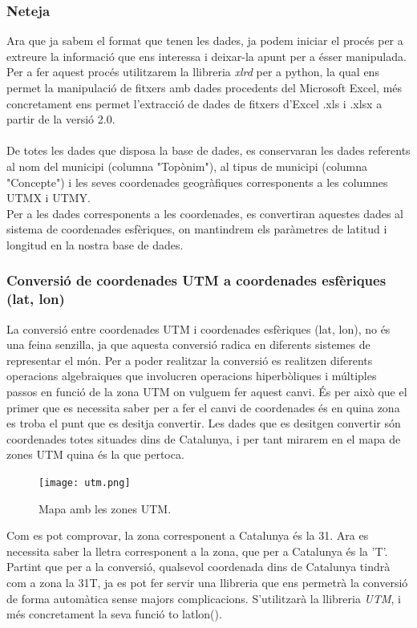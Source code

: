 \documentclass[12pt,a4paper,openright,oneside]{article}
\numberwithin{equation}{section}
\theoremstyle{definition}
\begin{document}
\subsubsection*{Neteja}
Ara que ja sabem el format que tenen les dades, ja podem iniciar el procés per a extreure la informació que ens interessa i deixar-la apunt per a ésser manipulada.\\
Per a fer aquest procés utilitzarem la llibreria \emph{xlrd} per a python, la qual ens permet la manipulació de fitxers amb dades procedents del Microsoft Excel, més concretament ens permet l'extracció de dades de fitxers d'Excel .xls i .xlsx a partir de la versió 2.0.\\ \\
De totes les dades que disposa la base de dades, es conservaran les dades referents al nom del municipi (columna "Topònim"), al tipus de municipi (columna "Concepte") i les seves coordenades geogràfiques corresponents a les columnes UTMX i UTMY.\\
Per a les dades corresponents a les coordenades, es convertiran aquestes dades al sistema de coordenades esfèriques, on mantindrem els paràmetres de latitud i longitud en la nostra base de dades.
\subsubsection*{Conversió de coordenades UTM a coordenades esfèriques (lat, lon)}
La conversió entre coordenades UTM i coordenades esfèriques (lat, lon), no és una feina senzilla, ja que aquesta conversió radica en diferents sistemes de representar el món. Per a poder realitzar la conversió es realitzen diferents operacions algebraiques que involucren operacions hiperbòliques i múltiples passos en funció de la zona UTM on vulguem fer aquest canvi. És per això que el primer que es necessita saber per a fer el canvi de coordenades és en quina zona es troba el punt que es desitja convertir. Les dades que es desitgen convertir són coordenades totes situades dins de Catalunya, i per tant mirarem en el mapa de zones UTM quina és la que pertoca.
\begin{figure}[htbp]
\centering
\texttt{[image: utm.png]}
\caption{Mapa amb les zones UTM.}
\end{figure}
\newpage
Com es pot comprovar, la zona corresponent a Catalunya és la 31. Ara es necessita saber la lletra corresponent a la zona, que per a Catalunya és la 'T'.\\
Partint que per a la conversió, qualsevol coordenada dins de Catalunya tindrà com a zona la 31T, ja es pot fer servir una llibreria que ens permetrà la conversió de forma automàtica sense majors complicacions. S'utilitzarà la llibreria \emph{UTM}, i més concretament la seva funció to latlon().
\end{document}
